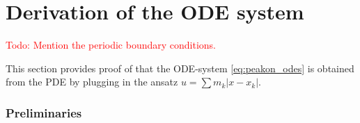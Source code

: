 \documentclass[english,master]{liumaiex}
\theoremstyle{plain}
\theoremstyle{definition}
\newcommand\todo[1]{\textcolor{red}{#1}}
\begin{document}
%
%
\newpage
\appendix

\section{Derivation of the ODE system} \label{sec:DerivationODE}

\todo{Todo: Mention the periodic boundary conditions.}

This section provides proof of that the ODE-system \eqref{eq:peakon_odes} is obtained from the PDE by plugging in the ansatz $u = \sum m_k |x - x_k|$.

\subsubsection*{Preliminaries}
\end{document}
